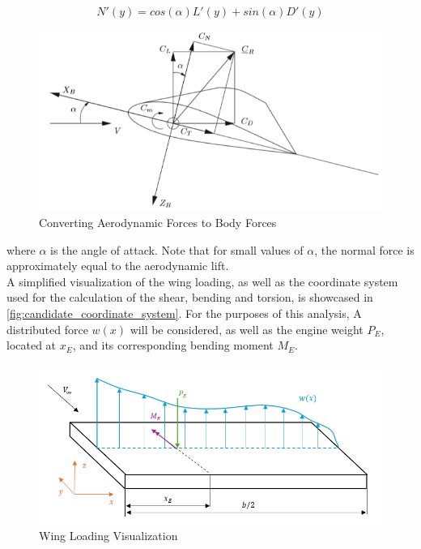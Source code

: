 \begin{equation}    \label{eq:forces_normal_transformation}
    N'(y)=cos(\alpha)L'(y)+sin(\alpha)D'(y)
\end{equation}

\begin{figure}[H]
    \centering
    \includegraphics[width=0.5\linewidth]{figures/coordinates_converting_forces.png}
    \caption{Converting Aerodynamic Forces to Body Forces \cite{Timmer2024ProjectDesign}}
    \label{fig:forces_coordinate_transformation}
\end{figure}


\noindent where $\alpha$ is the angle of attack. Note that for small values of $\alpha$, the normal force is approximately equal to the aerodynamic lift.\\

\noindent A simplified visualization of the wing loading, as well as the coordinate system used for the calculation of the shear, bending and torsion, is showcased in \autoref{fig:candidate_coordinate_system}. For the purposes of this analysis, A distributed force $w(x)$ will be considered, as well as the engine weight $P_E$, located at $x_E$, and its corresponding bending moment $M_E$.

\begin{figure}[H]
    \centering
    \includegraphics[width=0.5\linewidth]{beam_loading.png}
    \caption{Wing Loading Visualization}
    \label{fig:candidate_coordinate_system}
\end{figure}


